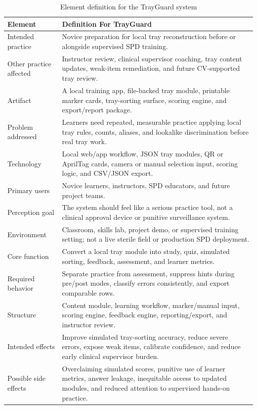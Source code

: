 \documentclass[10pt,a4paper]{article}
\begin{document}
\begin{table}[H]
\centering
\caption{Element definition for the TrayGuard system}
\label{tab:element-definition-for-the-trayguard-system}
\small\renewcommand{\arraystretch}{1.2}\setlength{\tabcolsep}{4pt}
\begin{tabularx}{\textwidth}{|>{\raggedright\arraybackslash}X|>{\raggedright\arraybackslash}X|}
\hline
Element & Definition For TrayGuard \\
\hline
Intended practice & Novice preparation for local tray reconstruction before or alongside supervised SPD training. \\
\hline
Other practice affected & Instructor review, clinical supervisor coaching, tray content updates, weak-item remediation, and future CV-supported tray review. \\
\hline
Artifact & A local training app, file-backed tray module, printable marker cards, tray-sorting surface, scoring engine, and export/report package. \\
\hline
Problem addressed & Learners need repeated, measurable practice applying local tray rules, counts, aliases, and lookalike discrimination before real tray work. \\
\hline
Technology & Local web/app workflow, JSON tray modules, QR or AprilTag cards, camera or manual selection input, scoring logic, and CSV/JSON export. \\
\hline
Primary users & Novice learners, instructors, SPD educators, and future project teams. \\
\hline
Perception goal & The system should feel like a serious practice tool, not a clinical approval device or punitive surveillance system. \\
\hline
Environment & Classroom, skills lab, project demo, or supervised training setting; not a live sterile field or production SPD deployment. \\
\hline
Core function & Convert a local tray module into study, quiz, simulated sorting, feedback, assessment, and learner metrics. \\
\hline
Required behavior & Separate practice from assessment, suppress hints during pre/post modes, classify errors consistently, and export comparable rows. \\
\hline
Structure & Content module, learning workflow, marker/manual input, scoring engine, feedback engine, reporting/export, and instructor review. \\
\hline
Intended effects & Improve simulated tray-sorting accuracy, reduce severe errors, expose weak items, calibrate confidence, and reduce early clinical supervisor burden. \\
\hline
Possible side effects & Overclaiming simulated scores, punitive use of learner metrics, answer leakage, inequitable access to updated modules, and reduced attention to supervised hands-on practice. \\
\hline
\end{tabularx}
\end{table}
\end{document}
